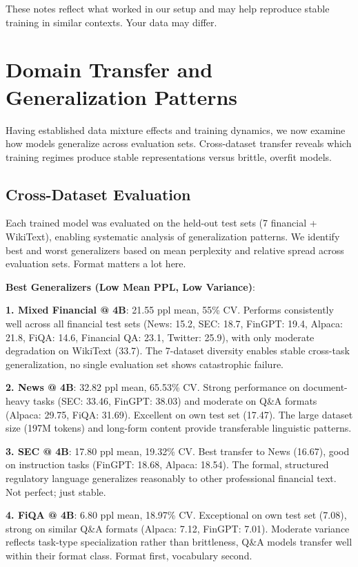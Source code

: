 These notes reflect what worked in our setup and may help reproduce stable training in similar contexts. Your data may differ.

\section{Domain Transfer and Generalization Patterns}

Having established data mixture effects and training dynamics, we now examine how models generalize across evaluation sets. Cross-dataset transfer reveals which training regimes produce stable representations versus brittle, overfit models.

\subsection{Cross-Dataset Evaluation}

Each trained model was evaluated on the held-out test sets (7 financial + WikiText), enabling systematic analysis of generalization patterns. We identify best and worst generalizers based on mean perplexity and relative spread across evaluation sets. Format matters a lot here.

\textbf{Best Generalizers (Low Mean PPL, Low Variance)}:

\textbf{1. Mixed Financial @ 4B}: 21.55 ppl mean, 55\% CV. Performs consistently well across all financial test sets (News: 15.2, SEC: 18.7, FinGPT: 19.4, Alpaca: 21.8, FiQA: 14.6, Financial QA: 23.1, Twitter: 25.9), with only moderate degradation on WikiText (33.7). The 7-dataset diversity enables stable cross-task generalization, no single evaluation set shows catastrophic failure.

\textbf{2. News @ 4B}: 32.82 ppl mean, 65.53\% CV. Strong performance on document-heavy tasks (SEC: 33.46, FinGPT: 38.03) and moderate on Q\&A formats (Alpaca: 29.75, FiQA: 31.69). Excellent on own test set (17.47). The large dataset size (197M tokens) and long-form content provide transferable linguistic patterns.

\textbf{3. SEC @ 4B}: 17.80 ppl mean, 19.32\% CV. Best transfer to News (16.67), good on instruction tasks (FinGPT: 18.68, Alpaca: 18.54). The formal, structured regulatory language generalizes reasonably to other professional financial text. Not perfect; just stable.

\textbf{4. FiQA @ 4B}: 6.80 ppl mean, 18.97\% CV. Exceptional on own test set (7.08), strong on similar Q\&A formats (Alpaca: 7.12, FinGPT: 7.01). Moderate variance reflects task-type specialization rather than brittleness, Q\&A models transfer well within their format class. Format first, vocabulary second.

